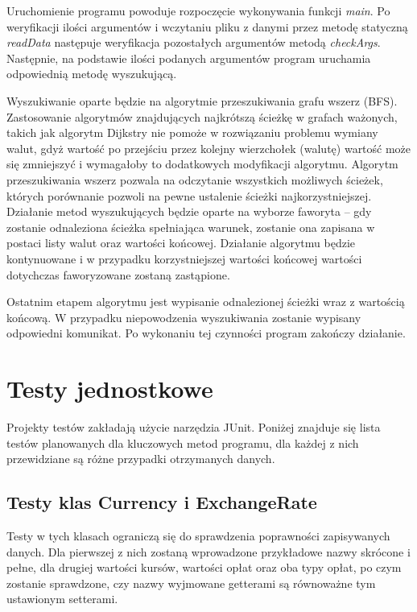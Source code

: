 \documentclass[a4paper,11pt]{article}
\newcommand\tab[1][0.6cm]{\hspace*{#1}}
\begin{document}
\tab Uruchomienie programu powoduje rozpoczęcie wykonywania funkcji \textit{main}. Po weryfikacji ilości argumentów i wczytaniu pliku z danymi przez metodę statyczną \textit{readData} następuje weryfikacja pozostałych argumentów metodą \textit{checkArgs}. Następnie, na podstawie ilości podanych argumentów program uruchamia odpowiednią metodę wyszukującą. 

Wyszukiwanie oparte będzie na algorytmie przeszukiwania grafu wszerz (BFS). Zastosowanie algorytmów znajdujących najkrótszą ścieżkę w grafach ważonych, takich jak algorytm Dijkstry nie pomoże w rozwiązaniu problemu wymiany walut, gdyż wartość po przejściu przez kolejny wierzchołek (walutę) wartość może się zmniejszyć i wymagałoby to dodatkowych modyfikacji algorytmu. Algorytm przeszukiwania wszerz pozwala na odczytanie wszystkich możliwych ścieżek, których porównanie pozwoli na pewne ustalenie ścieżki najkorzystniejszej. Działanie metod wyszukujących będzie oparte na wyborze faworyta -- gdy zostanie odnaleziona ścieżka spełniająca warunek, zostanie ona zapisana w postaci listy walut oraz wartości końcowej. Działanie algorytmu będzie kontynuowane i w przypadku korzystniejszej wartości końcowej wartości dotychczas faworyzowane zostaną zastąpione.

Ostatnim etapem algorytmu jest wypisanie odnalezionej ścieżki wraz z wartością końcową. W przypadku niepowodzenia wyszukiwania zostanie wypisany odpowiedni komunikat. Po wykonaniu tej czynności program zakończy działanie.

\section{Testy jednostkowe}

\tab Projekty testów zakładają użycie narzędzia JUnit. Poniżej znajduje się lista testów planowanych dla kluczowych metod programu, dla każdej z nich przewidziane są różne przypadki otrzymanych danych. 

\subsection{Testy klas Currency i ExchangeRate}

\tab Testy w tych klasach ograniczą się do sprawdzenia poprawności zapisywanych danych. Dla pierwszej z nich zostaną wprowadzone przykładowe nazwy skrócone i pełne, dla drugiej wartości kursów, wartości opłat oraz oba typy opłat, po czym zostanie sprawdzone, czy nazwy wyjmowane getterami są równoważne tym ustawionym setterami.
\end{document}

